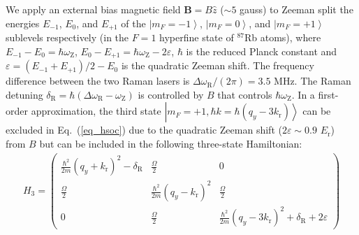 \documentclass[showpacs,preprintnumbers,amsmath,amssymb, superscriptaddress, aps, reprint]{revtex4-1}
\def\E_r{E_{\text{r}}}
\def\k_r{k_{\text{r}}}
\def\deltaR{\delta_{\text{R}}}
\def\omegaR{\omega_{\text{R}}}
\def\omegaZ{\omega_{\text{Z}}}
\begin{document}
{{{We apply an external bias magnetic field $\textbf{B}=B\hat{z}$ ($\sim 5$ gauss) to Zeeman split the energies $E_{-1}$, $E_{0}$, and $E_{+1}$ of the $\left| {{m_F} =  - 1} \right\rangle $, $\left| {{m_F} =  0} \right\rangle$, and $\left| {{m_F} =  +1} \right\rangle$ sublevels respectively (in the $F = 1$ hyperfine state of $^{87}$Rb atoms), where ${E_{ - 1}} - {E_0} = \hbar {\omegaZ}$, ${E_0} - {E_{ + 1}} = \hbar {\omegaZ} - 2\varepsilon$, $\hbar$ is the reduced Planck constant and $\varepsilon  = ({E_{ - 1}} + {E_{ + 1}})/2 - {E_0}$ is the quadratic Zeeman shift. The frequency difference between the two Raman lasers is $\Delta {\omegaR}/(2\pi ) = 3.5$ MHz. The Raman detuning ${\deltaR} = \hbar (\Delta {\omegaR} - {\omegaZ})$ is controlled by $B$ that controls $\hbar {\omegaZ}$. In a first-order approximation, the third state $\left| {{m_F} =  + 1,\hbar k = \hbar (q_y - 3{\k_r})} \right\rangle$ can be excluded in Eq.~(\ref{eq_hsoc}) due to the quadratic Zeeman shift ($2\varepsilon \sim 0.9$ $\E_r$) from $B$ but can be included in the following three-state Hamiltonian:
\begingroup\makeatletter\def\f@size{6}\check@mathfonts
\begin{align}
\label{eq_hsoc3}
H_{3}=
\begin{pmatrix}
\frac{\hbar^2}{2m}(q_y+\k_r)^2-\deltaR & \frac{\Omega}{2} & 0 \\ 
\frac{\Omega}{2} & \frac{\hbar^2}{2m}(q_y-\k_r)^2 & \frac{\Omega}{2} \\
0 & \frac{\Omega}{2} & \frac{\hbar^2}{2m}(q_y-3\k_r)^2+\deltaR+2\varepsilon
\end{pmatrix}
\end{align}
\endgroup
}}}
\end{document}
